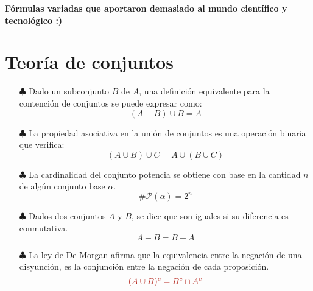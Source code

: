\documentclass[letterpaper,12pt]{article}
\begin{document}
\begin{center}
    \textbf{\Large{Fórmulas variadas que aportaron demasiado al mundo científico y tecnológico :)}}
\end{center}

\section{Teoría de conjuntos}
\begin{itemize}
    \item [$\clubsuit$] Dado un subconjunto $B$ de $A$, una definición equivalente para la contención de conjuntos se puede expresar como:
    \begin{equation*}
        (A - B) \cup B =A
    \end{equation*}
    
    \item [$\clubsuit$] La propiedad asociativa en la unión de conjuntos es una operación binaria que verifica:
    \begin{equation*}
        (A \cup B) \cup C = A \cup (B \cup C)
    \end{equation*}
    
    \item [$\clubsuit$] La cardinalidad del conjunto potencia se obtiene con base en la cantidad $n$ de algún conjunto base $\alpha$.
    \begin{equation*}
        \# \mathscr{P} (\alpha) = 2^{n}
    \end{equation*}
    
    \item [$\clubsuit$] Dados dos conjuntos $A$ y $B$, se dice que son iguales si su diferencia es conmutativa.
    \begin{equation*}
         A - B = B - A 
    \end{equation*}
    
    \item [$\clubsuit$] La ley de De Morgan afirma que la equivalencia entre la negación de una disyunción, es la conjunción entre la negación de cada proposición.
    \begin{equation*}
        \textcolor{BrickRed} {(A \cup B)^{c} = B^{c} \cap A^{c}}
    \end{equation*}
      
\end{itemize}
\end{document}
